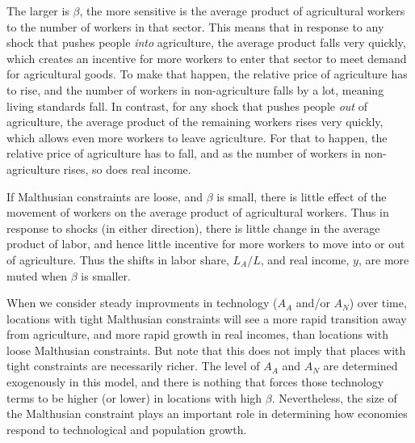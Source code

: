 \documentclass[11pt]{article}
\begin{document}
The larger is $\beta$, the more sensitive is the average product of agricultural workers to the number of workers in that sector. This means that in response to any shock that pushes people \textit{into} agriculture, the average product falls very quickly, which creates an incentive for more workers to enter that sector to meet demand for agricultural goods. To make that happen, the relative price of agriculture has to rise, and the number of workers in non-agriculture falls by a lot, meaning living standards fall. In contrast, for any shock that pushes people \textit{out} of agriculture, the average product of the remaining workers rises very quickly, which allows even more workers to leave agriculture. For that to happen, the relative price of agriculture has to fall, and as the number of workers in non-agriculture rises, so does real income.

If Malthusian constraints are loose, and $\beta$ is small, there is little effect of the movement of workers on the average product of agricultural workers. Thus in response to shocks (in either direction), there is little change in the average product of labor, and hence little incentive for more workers to move into or out of agriculture. Thus the shifts in labor share, $L_A/L$, and real income, $y$, are more muted when $\beta$ is smaller.

When we consider steady improvments in technology ($A_A$ and/or $A_N$) over time, locations with tight Malthusian constraints will see a more rapid transition away from agriculture, and more rapid growth in real incomes, than locations with loose Malthusian constraints. But note that this does not imply that places with tight constraints are necessarily richer. The level of $A_A$ and $A_N$ are determined exogenously in this model, and there is nothing that forces those technology terms to be higher (or lower) in locations with high $\beta$. Nevertheless, the size of the Malthusian constraint plays an important role in determining how economies respond to technological and population growth. 
\end{document}
